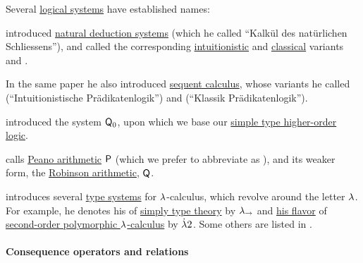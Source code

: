 \begin{remark}\label{rem:named_logical_systems}
  Several \hyperref[con:logical_system]{logical systems} have established names:
  \begin{itemize}
      introduced \hyperref[def:abstract_natural_deduction_system]{natural deduction systems} (which he called \enquote{Kalk\"ul des nat\"urlichen Schliessens}), and called the corresponding \hyperref[con:intuitionistic_logic]{intuitionistic} and \hyperref[con:classical_logic]{classical} variants  and .

    In the same paper he also introduced \hyperref[rem:sequent_calculus]{sequent calculus}, whose variants he called  (\enquote{Intuitionistische Pr\"adikatenlogik}) and  (\enquote{Klassik Pr\"adikatenlogik}).

      introduced the system \( \textsf{Q}_0 \), upon which we base our \hyperref[def:simply_typed_hol]{simple type higher-order logic}.

      calls \hyperref[def:peano_arithmetic]{Peano arithmetic} \( \textsf{P} \) (which we prefer to abbreviate as ), and its weaker form, the \hyperref[def:peano_arithmetic]{Robinson arithmetic}, \( \textsf{Q} \).

      introduces several \hyperref[def:abstract_type_system]{type systems} for \( {\mathrm \lambda} \)-calculus, which revolve around the letter \( {\mathrm \lambda} \). For example, he denotes his of \hyperref[con:simple_type_theory]{simply type theory} by \( {\mathrm \lambda}_{\rightarrow} \) and \hyperref[def:lambda_cube/type_on_term]{his flavor} of \hyperref[def:polymorphic_typed_lambda_calculus]{second-order polymorphic \( {\mathrm \lambda} \)-calculus} by \( \mathord{\dot{{\mathrm \lambda}}} 2 \). Some others are listed in .
  \end{itemize}
\end{remark}

\paragraph{Consequence operators and relations}

